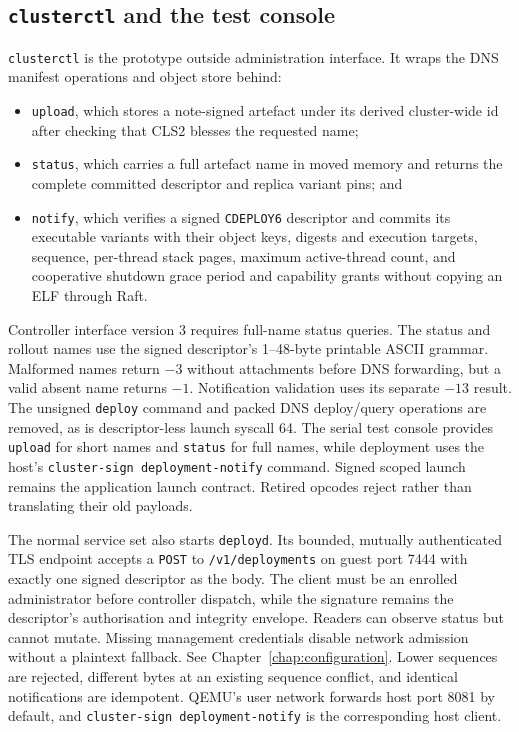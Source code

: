 \subsection{\texttt{clusterctl} and the test console}

\texttt{clusterctl} is the prototype outside administration interface. It
wraps the DNS manifest operations and object store behind:

\begin{itemize}
    \item \texttt{upload}, which stores a note-signed artefact under its
        derived cluster-wide id after checking that CLS2 blesses the requested
        name;
    \item \texttt{status}, which carries a full artefact name in moved memory
        and returns the complete committed descriptor and replica variant pins;
        and
    \item \texttt{notify}, which verifies a signed \texttt{CDEPLOY6}
        descriptor and commits its executable variants with their object keys,
        digests and execution targets, sequence, per-thread stack pages,
        maximum active-thread count, and
        cooperative shutdown grace period and capability grants without
        copying an ELF through Raft.
\end{itemize}

Controller interface version 3 requires full-name status queries. The
status and rollout names use the signed descriptor's 1--48-byte printable
ASCII grammar. Malformed names return $-3$ without attachments before DNS
forwarding, but a valid absent name returns $-1$. Notification validation uses
its separate $-13$ result.
The
unsigned \texttt{deploy} command and packed DNS deploy/query operations are
removed, as is descriptor-less launch syscall 64. The serial test console
provides \texttt{upload} for short names and \texttt{status} for full names, while
deployment uses the host's \texttt{cluster-sign deployment-notify} command.
Signed scoped launch remains the application launch contract. Retired opcodes
reject rather than translating their old payloads.

The normal service set also starts \texttt{deployd}. Its bounded, mutually
authenticated TLS endpoint accepts a \texttt{POST} to
\texttt{/v1/deployments} on guest port 7444 with exactly one signed descriptor
as the body. The client must be an enrolled administrator before controller
dispatch, while the signature remains the descriptor's authorisation and integrity
envelope. Readers can observe status but cannot mutate. Missing management
credentials disable network admission without a plaintext fallback. See
Chapter~\ref{chap:configuration}. Lower sequences
are rejected, different bytes at an existing sequence conflict, and identical
notifications are idempotent. QEMU's user network forwards host port 8081 by
default, and \texttt{cluster-sign deployment-notify} is the corresponding host
client.


